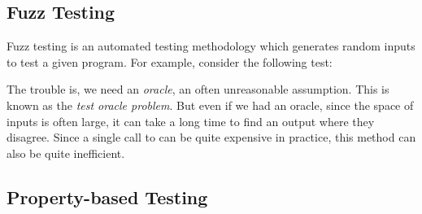 
\subsection{Fuzz Testing}

Fuzz testing is an automated testing methodology which generates random inputs to test a given program. For example, consider the following test:
%
%
The trouble is, we need an \textit{oracle}, an often unreasonable assumption. This is known as the \textit{test oracle problem}. But even if we had an oracle, since the space of inputs is often large, it can take a long time to find an output where they disagree. Since a single call to  can be quite expensive in practice, this method can also be quite inefficient.

\subsection{Property-based Testing}\label{subsec:property-based-testing}

